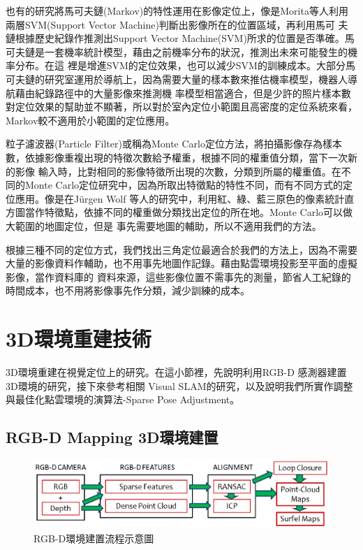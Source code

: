 	也有的研究將馬可夫鏈(Markov)的特性運用在影像定位上，像是Morita等人\cite{Morita2005}利用兩層SVM(Support Vector Machine)判斷出影像所在的位置區域，再利用馬可
夫鏈根據歷史紀錄作推測出Support Vector Machine(SVM)所求的位置是否準確。馬可夫鏈是一套機率統計模型，藉由之前機率分布的狀況，推測出未來可能發生的機率分布。在這
裡是增進SVM的定位效果，也可以減少SVM的訓練成本。大部分馬可夫鏈的研究室運用於導航上，因為需要大量的樣本數來推估機率模型，機器人導航藉由紀錄路徑中的大量影像來推測機
率模型相當適合，但是少許的照片樣本數對定位效果的幫助並不顯著，所以對於室內定位小範圍且高密度的定位系統來看，Markov較不適用於小範圍的定位應用。

	粒子濾波器(Particle Filter)或稱為Monte Carlo定位方法，將拍攝影像存為樣本數，依據影像重複出現的特徵次數給予權重，根據不同的權重值分類，當下一次新的影像
輸入時，比對相同的影像特徵所出現的次數，分類到所屬的權重值。在不同的Monte Carlo定位研究中，因為所取出特徵點的特性不同，而有不同方式的定位應用。像是在Jürgen Wolf
等人的研究中\cite{Wolf2005}，利用紅、綠、藍三原色的像素統計直方圖當作特徵點，依據不同的權重做分類找出定位的所在地。Monte Carlo可以做大範圍的地圖定位，但是
事先需要地圖的輔助，所以不適用我們的方法。

	根據三種不同的定位方式，我們找出三角定位最適合於我們的方法上，因為不需要大量的影像資料作輔助，也不用事先地圖作記錄。藉由點雲環境投影至平面的虛擬影像，當作資料庫的
資料來源，這些影像位置不需事先的測量，節省人工紀錄的時間成本，也不用將影像事先作分類，減少訓練的成本。
	
\section{3D環境重建技術}

	3D環境重建在視覺定位上的研究。在這小節裡，先說明利用RGB-D 感測器建置3D環境的研究，接下來參考相關
Visual SLAM的研究，以及說明我們所實作調整與最佳化點雲環境的演算法-Sparse Pose Adjustment。
	
\subsection{RGB-D Mapping 3D環境建置}
			
\begin{figure}
\begin{center}
  \includegraphics[width=1.0\textwidth]{figures/RGB-D_System_Overview.eps}
  \caption{\cite{Henry2012}RGB-D環境建置流程示意圖}
  \label{fig:RGB-D System}
\end{center}
\end{figure} 
							
